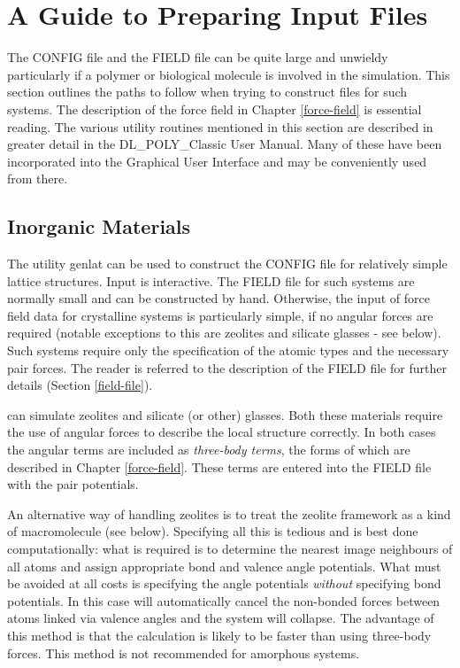 \section{A Guide to Preparing Input Files}

The CONFIG file and the FIELD file can be quite large and unwieldy
particularly if a polymer or biological molecule is involved in the
simulation.  This section outlines the paths to follow when trying
to construct files for such systems.  The description of the \D
force field in Chapter \ref{force-field} is essential reading.  The
various utility routines mentioned in this section are described in
greater detail in the DL\_POLY\_Classic User Manual.  Many of these
have been incorporated into the \D Graphical User
Interface \cite{smith-gui} and may
be conveniently used from there.

\subsection {Inorganic Materials}

The utility {\sc genlat} can be used to construct the CONFIG file
for relatively simple lattice structures.  Input is interactive. The
FIELD file for such systems are normally small and can be
constructed by hand.  Otherwise, the input of force field data for
crystalline systems is particularly simple, if no angular forces are
required (notable exceptions to this are zeolites and silicate
glasses - see below).  Such systems require only the specification
of the atomic types and the necessary pair forces.  The reader is
referred to the description of the \D FIELD file for further details
(Section \ref{field-file}).

\D can simulate zeolites and silicate (or other) glasses.  Both
these materials require the use of angular forces to describe the
local structure correctly.  In both cases the angular terms are
included as {\em three-body terms}, the forms of which are described
in Chapter \ref{force-field}.  These terms are entered into the
FIELD file with the pair potentials.

An alternative way of handling zeolites is to treat the zeolite
framework as a kind of macromolecule (see below).  Specifying all
this is tedious and is best done computationally: what is required
is to determine the nearest image neighbours of all atoms and assign
appropriate bond and valence angle potentials.  What must be avoided
at all costs is specifying the angle potentials {\em without}
specifying bond potentials.  In this case \D
will automatically cancel the non-bonded
forces between atoms linked via valence
angles and the system will collapse.
The advantage of this method is that the calculation is likely to be
faster than using three-body forces.
This method is not recommended for amorphous systems.

